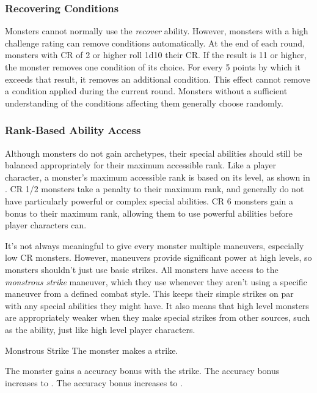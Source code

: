         \subsubsection{Recovering Conditions}
            Monsters cannot normally use the \textit{recover} ability.
            However, monsters with a high challenge rating can remove conditions automatically.
            At the end of each round, monsters with CR of 2 or higher roll 1d10 \add their CR.
            If the result is 11 or higher, the monster removes one condition of its choice.
            For every 5 points by which it exceeds that result, it removes an additional condition.
            This effect cannot remove a condition applied during the current round.
            Monsters without a sufficient understanding of the conditions affecting them generally choose randomly.

        \subsubsection{Rank-Based Ability Access}\label{Rank-Based Ability Access}
            Although monsters do not gain archetypes, their special abilities should still be balanced appropriately for their maximum accessible rank.
            Like a player character, a monster's maximum accessible rank is based on its level, as shown in .
            CR 1/2 monsters take a  penalty to their maximum rank, and generally do not have particularly powerful or complex special abilities.
            CR 6 monsters gain a  bonus to their maximum rank, allowing them to use powerful abilities before player characters can.

            It's not always meaningful to give every monster multiple maneuvers, especially low CR monsters.
            However, maneuvers provide significant power at high levels, so monsters shouldn't just use basic strikes.
            All monsters have access to the \textit{monstrous strike} maneuver, which they use whenever they aren't using a specific maneuver from a defined combat style.
            This keeps their simple strikes on par with any special abilities they might have.
            It also means that high level monsters are appropriately weaker when they make special strikes from other sources, such as the  ability, just like high level player characters.
            \begin{freeability}{Monstrous Strike}
                The monster makes a strike.

                \rankline
                 The monster gains a  accuracy bonus with the strike.
                 The accuracy bonus increases to .
                 The accuracy bonus increases to .
            \end{freeability}

